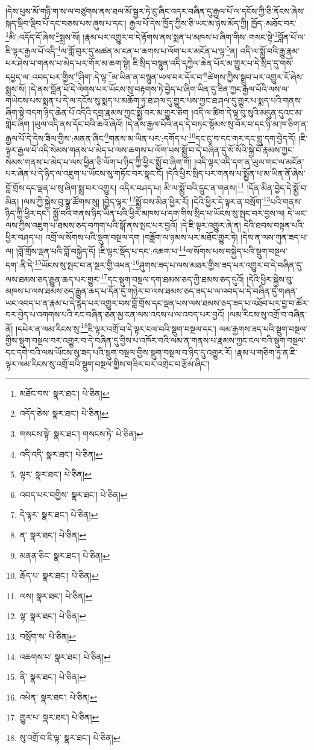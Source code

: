 །དེས་པུས་མོ་གཉི་ག་ས་ལ་བཙུགས་ནས་ཐལ་མོ་སྦྱར་ཏེ་ངུ་ཞིང་འདར་བཞིན་དུ་རྒྱལ་པོ་ལ་དངོས་ཀྱི་ཅི་ནོངས་ཞེས་སྐད་ལྡིབ་ལྡིབ་པོ་དང་བཅས་པས་ཞུས་པ་དང་། རྒྱལ་པོ་དེས་ཁྱོད་ཀྱིས་ཅི་ཡང་མ་ཉེས་མོད་ཀྱི། ཁྱོད་:མཐོང་བར་\footnote{མཐོང་བས་  སྣར་ཐང་།  པེ་ཅིན། }མི་:འདོད་དོ་ཞེས་\footnote{འདོད་ཅེས་  སྣར་ཐང་།  པེ་ཅིན། }སྨྲས་སོ། །རྣམ་པར་འགྱུར་བ་དེ་རྟོགས་ནས་སྨན་པ་མཁས་པ་ཞིག་གིས་:གསང་སྟེ་\footnote{གསངས་སྟེ་  སྣར་ཐང་། གསངས་ཏེ་  པེ་ཅིན། }བློན་པོ་ལ་ཇི་ལྟར་རྒྱལ་པོ་འདི་\footnote{འདི་འདི་  སྣར་ཐང་།  པེ་ཅིན། }ལ་གློ་བུར་དུ་མཚན་མ་ངན་པ་ཆགས་པ་ལོག་པར་མངོན་པ་ལྟ་\footnote{ལྟར་  སྣར་ཐང་།  པེ་ཅིན། }ན། འདི་ལ་སྨྱོ་བའི་རྒྱུ་རྣམ་པར་ཤེས་པ་གནས་པ་མེད་པར་གོར་མ་ཆག་སྟེ། ཇི་སྲིད་བསྙུན་འདི་དཀྱེལ་ཆེན་པོར་མ་གྱུར་པ་དེ་སྲིད་དུ་གསོ་དཔྱད་ལ་:འབད་པར་གྱིས་\footnote{འབད་པར་བགྱིས་  སྣར་ཐང་།  པེ་ཅིན། }ཤིག་:དེ་ལྟ་\footnote{དེ་ལྟར་  སྣར་ཐང་།  པེ་ཅིན། }མ་ཡིན་ན་བསྙུན་ཡལ་བར་དོར་བ་\footnote{ན་  སྣར་ཐང་།  པེ་ཅིན། }ཚེགས་ཀྱིས་སྒྲུབ་པར་འགྱུར་རོ་ཞེས་སྨྲས་སོ། །དེ་ནས་བློན་པོ་དེ་ལེགས་པར་ཡོངས་སུ་བརྟགས་ཏེ་བྱེད་པ་ཞིག་ཡིན་དུ་ཟིན་ཀྱང་རྒྱལ་པོའི་ལས་ལ་གཡེངས་པས་སྨན་པ་དེ་ལ་དངོས་སུ་སྨད་པ་མཆོག་ཏུ་ཐ་ཤལ་དུ་གྱུར་པས་ཀྱང་ཐ་ཤལ་དུ་གྱུར་པ་སྨད་པའི་གནས་ཞིག་སྟེ་བདག་ཉིད་ཆེན་པོ་འདིའི་དགྲ་རྣམས་ཀྱང་སྨྱོ་བར་མ་གྱུར་ཅིག །འདི་ལ་ཚིག་དེ་ལྟ་བུ་སུའི་མདུན་དུའང་མ་གླེང་ཞིག །ཡུལ་འདི་ནས་དོང་བའི་ཆའོ་ཞེའོ། །དེ་ནས་རྒྱལ་པོའི་ནད་དེ་བཏང་སྙོམས་སུ་བོར་བ་དང་ཉི་མ་ཁ་ཅིག་ན་རྒྱལ་པོ་དེ་དེས་ཟིལ་གྱིས་:མནན་ཞིང་\footnote{མནན་ཅིང་  སྣར་ཐང་།  པེ་ཅིན། }གནས་མ་ཡིན་པར་:དགོད་པ་\footnote{རྒོད་པ་  སྣར་ཐང་།  པེ་ཅིན། }དང་ངུ་བ་དང་གར་དང་གླུ་དག་བྱེད་དོ། །ཇི་ལྟར་རྒྱལ་པོ་འདི་སེམས་གནས་པ་མེད་པ་ལས་ཆགས་པ་ལོག་པས་སྨྱོ་བ་དེ་བཞིན་དུ་སོ་སོའི་སྐྱེ་བོ་རྣམས་ཀྱང་སེམས་གནས་པ་མེད་པ་ལས་ཕྱིན་ཅི་ལོག་པ་ཉིད་ཀྱི་ཕྱིར་སྨྱོ་བ་ཞིག་གོ། །འདི་ལྟར་འདི་དག་ན་ཡུལ་གང་ལ་མངོན་པར་ཞེན་པ་དེ་ཉིད་ལ་འཇུག་པ་ཡོངས་སུ་གཏོང་བར་སྣང་ངོ། །དེའི་ཕྱིར་སྲིད་པར་གནས་པ་སྨྱོན་པ་མ་ཡིན་ནོ་ཞེས་བློ་གྲོས་དང་ལྡན་པ་སུ་ཞིག་སྨྲ་བར་འགྱུར། འདིར་བཤད་པ། མི་ལ་སྨྱོ་བའི་དྲུང་ན་གནས།\footnote{ལས།  སྣར་ཐང་།  པེ་ཅིན། } །དོན་མིན་བྱེད་དེ་སྨྱོ་བ་མིན། །ལས་ཀྱི་སྐྱེས་བུ་སྣ་ཚོགས་སུ། །བྱེད་ལྟར་\footnote{ལྟ་  སྣར་ཐང་།  པེ་ཅིན། }སྨྱོ་བས་མིན་ཕྱིར་རོ། །དེའི་ཕྱིར་དེ་ལྟར་ན་བསྲོག་\footnote{བསྲོག་ས་  པེ་ཅིན། }པའི་གནས་ཉིད་ཀྱི་ཕྱིར་དང་། སྨྱོ་བའི་གནས་ཉིད་ཡིན་པའི་ཕྱིར་མཁས་པ་དག་གིས་སྲིད་པ་ཡོངས་སུ་སྤང་བར་བྱས་ལ། དེ་ཡང་ལས་ཀྱིས་འཇུག་པ་ཐམས་ཅད་བཀག་པའི་སྒོ་ནས་སྤང་པར་བྱའོ། །དེ་ཇི་ལྟར་འགྱུར་ཞེ་ན། དེའི་ཐབས་བསྟན་པའི་ཕྱིར་བཤད་པ། འགྲོ་ལ་སོགས་པའི་སྡུག་བསྔལ་དག །བཟློག་ལ་ཉམས་པར་མཐོང་གྱུར་ཏེ། །དེས་ན་ལས་ཀུན་ཟད་པ་ལ། །བློ་གྲོས་ལྡན་པའི་བློ་བསྐྱེད་དོ། །ཇི་ལྟར་སྡོད་པ་དང་:འཆག་པ་\footnote{འཆགས་པ་  སྣར་ཐང་།  པེ་ཅིན། }ལ་སོགས་པས་བསྐྱེད་པའི་སྡུག་བསྔལ་དག་:ནི་དེ་\footnote{ནི་  སྣར་ཐང་།  པེ་ཅིན། }ཡོངས་སུ་སྤང་བ་ན་སྔར་གྱི་འཕན་\footnote{འཕེན་  སྣར་ཐང་།  པེ་ཅིན། }ཤུགས་ཟད་པ་ལས་མཐར་གྱིས་ཟད་པར་འགྱུར་བ་དེ་བཞིན་དུ་ལས་ཐམས་ཅད་རྒྱུན་ཆད་པར་གྱུར་\footnote{གྱུར་པ་  སྣར་ཐང་།  པེ་ཅིན། }དང་སྡུག་བསྔལ་དག་ཐམས་ཅད་ཀྱི་ཐམས་ཅད་དུའོ། །དེའི་ཕྱིར་སྐྱེས་བུ་མཁས་པ་ལས་ཐམས་ཅད་རྒྱུན་ཆད་པ་དོན་དུ་གཉེར་བ་ལས་ཐམས་ཅད་ཟད་པ་ལ་འབད་པ་དེ་བཞིན་དུ་གཞན་ཡང་འབད་པ་ན་རྣམ་པ་དེ་རྙེད་པར་འགྱུར་བས་བློ་གྲོས་དང་ལྡན་པས་ལས་ཐམས་ཅད་ཟད་པ་འཐོབ་པར་བྱ་བ་ཚོར་བར་བྱེད་པ་འགགས་པའི་རང་བཞིན་ཅན་མྱ་ངན་ལས་འདས་པ་ལ་འབད་པར་བྱའོ། །ལམ་རིངས་སུ་འགྲོ་བ་བཞིན་ནོ། །དཔེར་ན་ལམ་རིངས་སུ་\footnote{སུ་འགྲོ་བ་ཇི་ལྟ་  སྣར་ཐང་།  པེ་ཅིན། }ཇི་ལྟར་འགྲོ་བ་དེ་ལྟར་ངལ་བའི་སྡུག་བསྔལ་དང་། ལམ་རྒྱགས་ཟད་པའི་སྡུག་བསྔལ་གྱིས་སྡུག་བསྔལ་བར་འགྱུར་བ་དེ་བཞིན་དུ་བྱིས་པ་འཁོར་བའི་ལམ་ན་གནས་པ་རྣམས་ཀྱང་ངལ་བའི་སྡུག་བསྔལ་དང་དགེ་བའི་ལས་ཡོངས་སུ་ཟད་པའི་སྡུག་བསྔལ་གྱིས་སྡུག་བསྔལ་བ་ཉིད་དུ་འགྱུར་རོ། །རྣམ་པ་གཅིག་ཏུ་ན་ཇི་ལྟར་ལམ་རིངས་སུ་འགྲོ་བའི་སྡུག་བསྔལ་གྱིས་གཟིར་བར་འགྲེང་བ་རྩོམ་ཞིང་། 